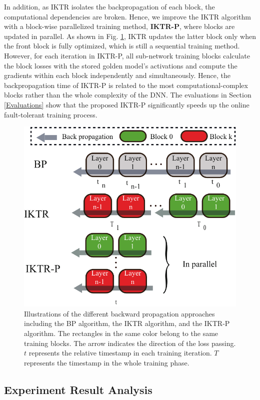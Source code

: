 In addition, as IKTR isolates the backpropagation of each block, the computational dependencies are broken. Hence, we improve the IKTR algorithm with a block-wise parallelized training method, {\bf IKTR-P}, where blocks are updated in parallel. As shown in Fig. \ref{fig:paralleltraining}, IKTR updates the latter block only when the front block is fully optimized, which is still a sequential training method. However, for each iteration in IKTR-P, all sub-network training blocks calculate the block losses with the stored golden model's activations and compute the gradients within each block independently and simultaneously. Hence, the backpropagation time of IKTR-P is related to the most computational-complex blocks rather than the whole complexity of the DNN. The evaluations in Section \ref{Evaluations} show that the proposed IKTR-P significantly speeds up the online fault-tolerant training process.

\begin{figure}
    \centering
    \includegraphics[width=0.75\linewidth]{images/OL-fig9}
    \caption{Illustrations of the different backward propagation approaches including the BP algorithm, the IKTR algorithm, and the IKTR-P algorithm. The rectangles in the same color belong to the same training blocks. The arrow indicates the direction of the loss passing. $t$ represents the relative timestamp in each training iteration. $T$ represents the timestamp in the whole training phase.}
    \label{fig:paralleltraining} 
    \vspace{-10pt}
\end{figure}

\subsection{Experiment Result Analysis}
